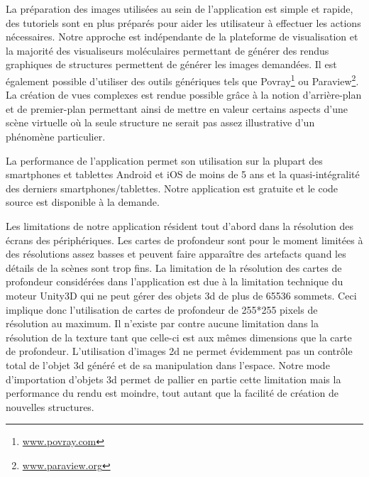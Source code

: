 La préparation des images utilisées au sein de l'application est simple et rapide, des tutoriels sont en plus préparés pour aider les utilisateur à effectuer les actions nécessaires. Notre approche est indépendante de la plateforme de visualisation et la majorité des visualiseurs moléculaires permettant de générer des rendus graphiques de structures permettent de générer les images demandées. Il est également possible d'utiliser des outils génériques tels que Povray\footnote{\url{www.povray.com}} ou Paraview\footnote{\url{www.paraview.org}}. La création de vues complexes est rendue possible grâce à la notion d'arrière-plan et de premier-plan permettant ainsi de mettre en valeur certains aspects d'une scène virtuelle où la seule structure ne serait pas assez illustrative d'un phénomène particulier.

La performance de l'application permet son utilisation sur la plupart des smartphones et tablettes Android et iOS de moins de 5 ans et la quasi-intégralité des derniers smartphones/tablettes. Notre application est gratuite et le code source est disponible à la demande.

Les limitations de notre application résident tout d'abord dans la résolution des écrans des périphériques. Les cartes de profondeur sont pour le moment limitées à des résolutions assez basses et peuvent faire apparaître des artefacts quand les détails de la scènes sont trop fins. La limitation de la résolution des cartes de profondeur considérées dans l'application est due à la limitation technique du moteur Unity3D qui ne peut gérer des objets 3d de plus de 65536 sommets. Ceci implique donc l'utilisation de cartes de profondeur de 255*255 pixels de résolution au maximum. Il n'existe par contre aucune limitation dans la résolution de la texture tant que celle-ci est aux mêmes dimensions que la carte de profondeur. L'utilisation d'images 2d ne permet évidemment pas un contrôle total de l'objet 3d généré et de sa manipulation dans l'espace. Notre mode d'importation d'objets 3d permet de pallier en partie cette limitation mais la performance du rendu est moindre, tout autant que la facilité de création de nouvelles structures.